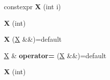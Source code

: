 \begin{DoxyCompactItemize}
constexpr {\bfseries X} (int i)
\item 
\mbox{\label{class_x_a36e9aecdd69489f3436c834184070c09}} 
{\bfseries X} (int)
\item 
\mbox{\label{class_x_ae725d2cf117097fe4897d7af4de5157f}} 
{\bfseries X} (\mbox{\hyperlink{class_x}{X}} \&\&)=default
\item 
\mbox{\label{class_x_a5d5d7c57342a046ac39fc6344cae1a76}} 
\mbox{\hyperlink{class_x}{X}} \& {\bfseries operator=} (\mbox{\hyperlink{class_x}{X}} \&\&)=default
\item 
\mbox{\label{class_x_a36e9aecdd69489f3436c834184070c09}} 
{\bfseries X} (int)
\end{DoxyCompactItemize}
